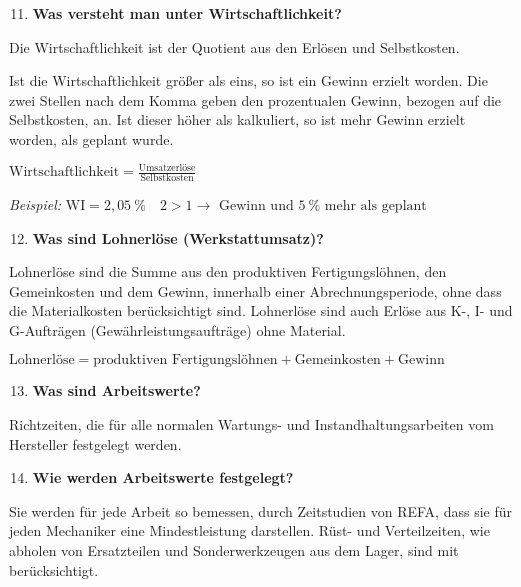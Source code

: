\begin{enumerate}
\setcounter{enumi}{10}
\item
  \textbf{Was versteht man unter Wirtschaftlichkeit?}
\end{enumerate}

Die Wirtschaftlichkeit ist der Quotient aus den Erlösen und
Selbstkosten.

Ist die Wirtschaftlichkeit größer als eins, so ist ein Gewinn erzielt
worden. Die zwei Stellen nach dem Komma geben den prozentualen Gewinn,
bezogen auf die Selbstkosten, an. Ist dieser höher als kalkuliert, so
ist mehr Gewinn erzielt worden, als geplant wurde.

$\boxed{\text{Wirtschaftlichkeit} = \frac{\text{Umsatzerlöse}}{\text{Selbstkosten}}}$

\emph{Beispiel:}
$\text{WI} = 2,05~\% \quad 2 > 1 \to \text{ Gewinn und } 5~\% \text{ mehr als geplant}$

\begin{enumerate}
\setcounter{enumi}{11}
\item
  \textbf{Was sind Lohnerlöse (Werkstattumsatz)?}
\end{enumerate}

Lohnerlöse sind die Summe aus den produktiven Fertigungslöhnen, den
Gemeinkosten und dem Gewinn, innerhalb einer Abrechnungsperiode, ohne
dass die Materialkosten berücksichtigt sind. Lohnerlöse sind auch Erlöse
aus K-, I- und G-Aufträgen (Gewährleistungsaufträge) ohne Material.

$\boxed{\text{Lohnerlöse} = \text{produktiven Fertigungslöhnen} + \text{Gemeinkosten} + \text{Gewinn}}$

\begin{enumerate}
\setcounter{enumi}{12}
\item
  \textbf{Was sind Arbeitswerte?}
\end{enumerate}

Richtzeiten, die für alle normalen Wartungs- und Instandhaltungsarbeiten
vom Hersteller festgelegt werden.

\begin{enumerate}
\setcounter{enumi}{13}
\item
  \textbf{Wie werden Arbeitswerte festgelegt?}
\end{enumerate}

Sie werden für jede Arbeit so bemessen, durch Zeitstudien von REFA, dass
sie für jeden Mechaniker eine Mindestleistung darstellen. Rüst- und
Verteilzeiten, wie abholen von Ersatzteilen und Sonderwerkzeugen aus dem
Lager, sind mit berücksichtigt.

